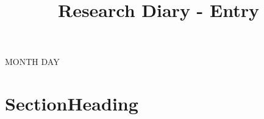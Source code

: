 \newpage

\renewcommand{\varYear}{YEAR}
\renewcommand{\varMonth}{MONTH}
\renewcommand{\varDay}{DAY}
\renewcommand{\workingDate}{\textsc{\varYear $|$ \varMonth $|$ \varDay}}

\univlogo

\title{Research Diary - Entry}

{\Huge \varMonth{} \varDay}\\[5mm]
\label{sec:\varDay\varMonth\varYear}


\section*{SectionHeading}


